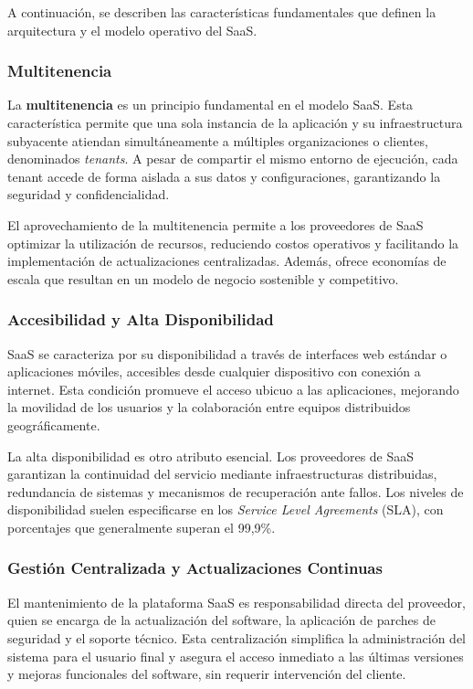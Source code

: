 {            A continuación, se describen las características fundamentales que definen la arquitectura y el modelo operativo del SaaS.
            
            \subsubsection{Multitenencia}
                La \textbf{multitenencia} es un principio fundamental en el modelo SaaS. Esta característica permite que una sola instancia de la aplicación y su infraestructura subyacente atiendan simultáneamente a múltiples organizaciones o clientes, denominados \textit{tenants}. A pesar de compartir el mismo entorno de ejecución, cada tenant accede de forma aislada a sus datos y configuraciones, garantizando la seguridad y confidencialidad.
            
                El aprovechamiento de la multitenencia permite a los proveedores de SaaS optimizar la utilización de recursos, reduciendo costos operativos y facilitando la implementación de actualizaciones centralizadas. Además, ofrece economías de escala que resultan en un modelo de negocio sostenible y competitivo.
            
            \subsubsection{Accesibilidad y Alta Disponibilidad}
                SaaS se caracteriza por su disponibilidad a través de interfaces web estándar o aplicaciones móviles, accesibles desde cualquier dispositivo con conexión a internet. Esta condición promueve el acceso ubicuo a las aplicaciones, mejorando la movilidad de los usuarios y la colaboración entre equipos distribuidos geográficamente.
                
                La alta disponibilidad es otro atributo esencial. Los proveedores de SaaS garantizan la continuidad del servicio mediante infraestructuras distribuidas, redundancia de sistemas y mecanismos de recuperación ante fallos. Los niveles de disponibilidad suelen especificarse en los \textit{Service Level Agreements} (SLA), con porcentajes que generalmente superan el 99,9\%.
        
            \subsubsection{Gestión Centralizada y Actualizaciones Continuas}
                El mantenimiento de la plataforma SaaS es responsabilidad directa del proveedor, quien se encarga de la actualización del software, la aplicación de parches de seguridad y el soporte técnico. Esta centralización simplifica la administración del sistema para el usuario final y asegura el acceso inmediato a las últimas versiones y mejoras funcionales del software, sin requerir intervención del cliente.
                
}

